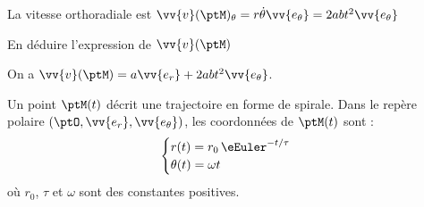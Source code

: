 
\begin{corrige}
	La vitesse orthoradiale est $\vv{v}(\ptM)_\theta=r\dot{\theta} \vv{e_\theta}=2abt^2 \vv{e_\theta}$
\end{corrige}




\begin{enonce}
	En déduire l'expression de $\vv{v}(\ptM)$ 
\end{enonce}


\begin{corrige}
	On a $\vv{v}(\ptM)=a\vv{e_r}+2abt^2 \vv{e_\theta}$.
\end{corrige}


\finEntrainement







\hauteurLargeurCadreReponse		{8mm}{4cm}
\typeEntrainement				{} %
\initialisationEntrainement


Un point $\ptM(t)$ décrit une trajectoire en forme de spirale. 
Dans le repère polaire $(\ptO, \vv{e_r}, \vv{e_\theta})$, les coordonnées de $\ptM(t)$ sont :
\[
\begin{cases}
	r(t) = r_0\, \eEuler^{-t/\tau}\\
	\theta(t)  = \omega t 
\end{cases}
\]
où $r_0$, $\tau$ et $\omega$ sont des constantes positives.


